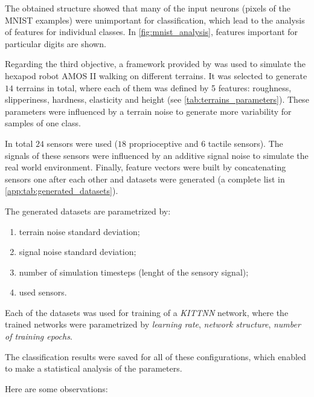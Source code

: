 The obtained structure showed that many of the input neurons (pixels of the MNIST examples) were unimportant for classification, which lead to the analysis of features for individual classes. In \cref{fig:mnist_analysis}, features important for particular digits are shown.

Regarding the third objective, a framework provided by \citep{misc:lpzrobots} was used to simulate the hexapod robot AMOS II walking on different terrains. It was selected to generate $ 14 $ terrains in total, where each of them was defined by 5 features: roughness, slipperiness, hardness, elasticity and height (see \cref{tab:terrains_parameters}). These parameters were influenced by a terrain noise to generate more variability for samples of one class.

In total $ 24 $ sensors were used ($ 18 $ proprioceptive and $ 6 $ tactile sensors). The signals of these sensors were influenced by an additive signal noise to simulate the real world environment. Finally, feature vectors were built by concatenating sensors one after each other and datasets were generated (a complete list in \cref{app:tab:generated_datasets}).

The generated datasets are parametrized by:

\begin{enumerate}
\item terrain noise standard deviation;
\item signal noise standard deviation;
\item number of simulation timesteps (lenght of the sensory signal);
\item used sensors.
\end{enumerate}

Each of the datasets was used for training of a \textit{KITTNN} network, where the trained networks were parametrized by \textit{learning rate}, \textit{network structure}, \textit{number of training epochs}.

The classification results were saved for all of these configurations, which enabled to make a statistical analysis of the parameters. 

Here are some observations:

